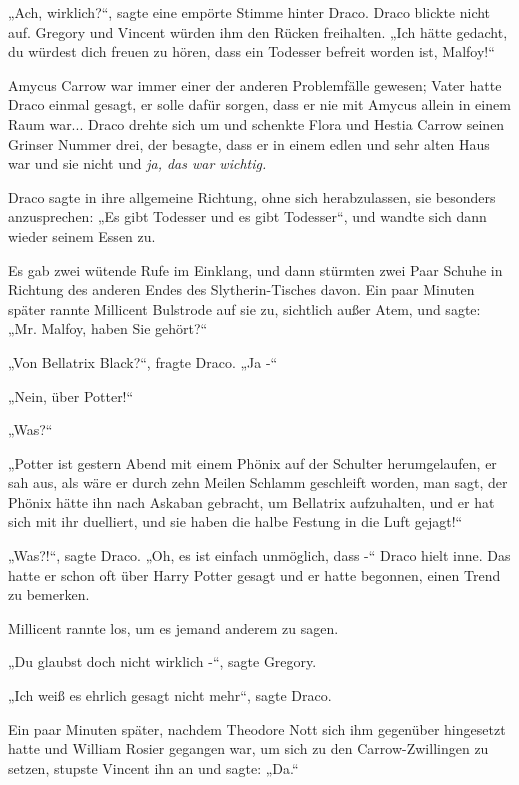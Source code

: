 {„Ach, wirklich?“, sagte eine empörte Stimme hinter Draco. Draco blickte nicht auf. Gregory und Vincent würden ihm den Rücken freihalten. „Ich hätte gedacht, du würdest dich freuen zu hören, dass ein Todesser befreit worden ist, Malfoy!“

Amycus Carrow war immer einer der anderen Problemfälle gewesen; Vater hatte Draco einmal gesagt, er solle dafür sorgen, dass er nie mit Amycus allein in einem Raum war... Draco drehte sich um und schenkte Flora und Hestia Carrow seinen Grinser Nummer drei, der besagte, dass er in einem edlen und sehr alten Haus war und sie nicht und \emph{ja, das war wichtig.}

Draco sagte in ihre allgemeine Richtung, ohne sich herabzulassen, sie besonders anzusprechen: „Es gibt Todesser und es gibt Todesser“, und wandte sich dann wieder seinem Essen zu.

Es gab zwei wütende Rufe im Einklang, und dann stürmten zwei Paar Schuhe in Richtung des anderen Endes des Slytherin-Tisches davon. Ein paar Minuten später rannte Millicent Bulstrode auf sie zu, sichtlich außer Atem, und sagte: „Mr. Malfoy, haben Sie gehört?“

„Von Bellatrix Black?“, fragte Draco. „Ja -“

„Nein, über Potter!“

„Was?“

„Potter ist gestern Abend mit einem Phönix auf der Schulter herumgelaufen, er sah aus, als wäre er durch zehn Meilen Schlamm geschleift worden, man sagt, der Phönix hätte ihn nach Askaban gebracht, um Bellatrix aufzuhalten, und er hat sich mit ihr duelliert, und sie haben die halbe Festung in die Luft gejagt!“

„Was?!“, sagte Draco. „Oh, es ist einfach unmöglich, dass -“ Draco hielt inne. Das hatte er schon oft über Harry Potter gesagt und er hatte begonnen, einen Trend zu bemerken.

Millicent rannte los, um es jemand anderem zu sagen.

„Du glaubst doch nicht wirklich -“, sagte Gregory.

„Ich weiß es ehrlich gesagt nicht mehr“, sagte Draco.

Ein paar Minuten später, nachdem Theodore Nott sich ihm gegenüber hingesetzt hatte und William Rosier gegangen war, um sich zu den Carrow-Zwillingen zu setzen, stupste Vincent ihn an und sagte: „Da.“

}
